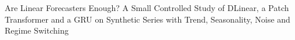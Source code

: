 Are Linear Forecasters Enough? A Small Controlled Study of DLinear, a Patch Transformer and a GRU on Synthetic Series with Trend, Seasonality, Noise and Regime Switching

